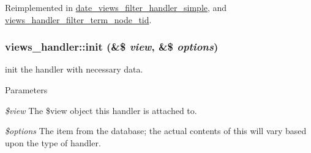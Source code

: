 Reimplemented in \hyperlink{classdate__views__filter__handler__simple_ad1e692e5222cc417dcd83cdbdac1a270}{date\_\-views\_\-filter\_\-handler\_\-simple}, and \hyperlink{classviews__handler__filter__term__node__tid_a72232eda675756741ce92061cb4685ee}{views\_\-handler\_\-filter\_\-term\_\-node\_\-tid}.\hypertarget{classviews__handler_aa7df174ffa94ab095f7b9fdf154bcc30}{
\subsubsection[{init}]{\setlength{\rightskip}{0pt plus 5cm}views\_\-handler::init (\&\$ {\em view}, \/  \&\$ {\em options})}}
\label{classviews__handler_aa7df174ffa94ab095f7b9fdf154bcc30}
init the handler with necessary data. 
\begin{DoxyParams}{Parameters}
\item[{\em \$view}]The \$view object this handler is attached to. \item[{\em \$options}]The item from the database; the actual contents of this will vary based upon the type of handler. \end{DoxyParams}


